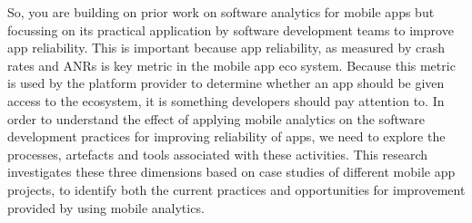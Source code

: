 \begin{kaobox}
So, you are building on prior work on software analytics for mobile apps but focussing on its practical application by software development teams to improve app reliability. This is important because app reliability, as measured by crash rates and ANRs is key metric in the mobile app eco system. Because this metric is used by the platform provider to determine whether an app should be given access to the ecosystem, it is something developers should pay attention to. In order to understand the effect of applying mobile analytics on the software development practices for  improving reliability of apps, we need to explore the processes, artefacts and tools associated with these activities. This research investigates these three dimensions based on case studies of different mobile app projects, to identify both the current practices and opportunities for improvement provided by using mobile analytics.
\end{kaobox}

